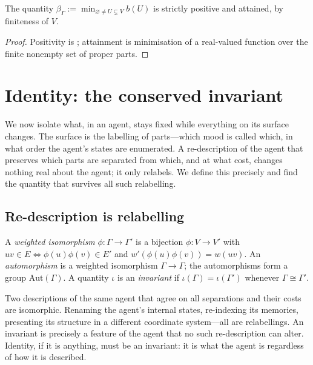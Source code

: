 \documentclass[11pt,twocolumn,a4paper]{article}
\newcommand{\Self}{\Gamma}          %
\newcommand{\V}{V}
\newcommand{\E}{E}
\newcommand{\wt}{w}
\newcommand{\floorc}{\beta}          %
\begin{document}
\begin{corollary}
\label{cor:realised}
The quantity $\floorc_\Self:=\min_{\varnothing\neq U\subsetneq\V}b(U)$ is
strictly positive and attained, by finiteness of $\V$.
\end{corollary}

\begin{proof}
Positivity is ; attainment is minimisation of a
real-valued function over the finite nonempty set of proper parts.
\end{proof}

\section{Identity: the conserved invariant}
\label{sec:identity}

We now isolate what, in an agent, stays fixed while everything on its
surface changes. The surface is the labelling of parts---which mood is
called which, in what order the agent's states are enumerated. A
re-description of the agent that preserves which parts are separated from
which, and at what cost, changes nothing real about the agent; it only
relabels. We define this precisely and find the quantity that survives
all such relabelling.

\subsection{Re-description is relabelling}

\begin{definition}
\label{def:iso}
A \emph{weighted isomorphism} $\phi:\Self\to\Self'$ is a bijection
$\phi:\V\to\V'$ with $uv\in\E\iff\phi(u)\phi(v)\in\E'$ and
$\wt'(\phi(u)\phi(v))=\wt(uv)$. An \emph{automorphism} is a weighted
isomorphism $\Self\to\Self$; the automorphisms form a group
$\mathrm{Aut}(\Self)$. A quantity $\iota$ is an \emph{invariant} if
$\iota(\Self)=\iota(\Self')$ whenever $\Self\cong\Self'$.
\end{definition}

\begin{remark}
\label{rem:relabel}
Two descriptions of the same agent that agree on all separations and
their costs are isomorphic. Renaming the agent's internal states,
re-indexing its memories, presenting its structure in a different
coordinate system---all are relabellings. An invariant is precisely a
feature of the agent that no such re-description can alter. Identity, if
it is anything, must be an invariant: it is what the agent is regardless
of how it is described.
\end{remark}
\end{document}
